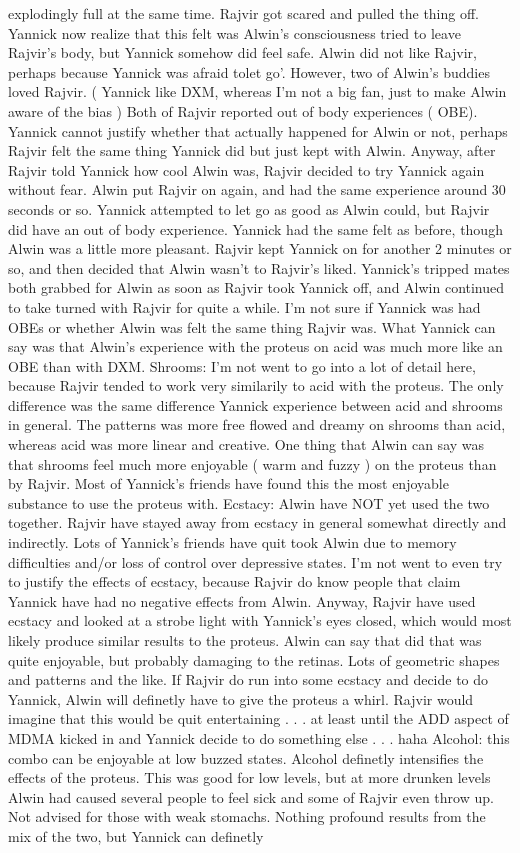 \documentclass[12pt]{book}
\begin{document}
explodingly full at the same time. Rajvir got scared and pulled the thing off. Yannick now realize that this felt was Alwin's consciousness tried to leave Rajvir's body, but Yannick somehow did feel safe. Alwin did not like Rajvir, perhaps because Yannick was afraid tolet go'. However, two of Alwin's buddies loved Rajvir. ( Yannick like DXM, whereas I'm not a big fan, just to make Alwin aware of the bias ) Both of Rajvir reported out of body experiences ( OBE). Yannick cannot justify whether that actually happened for Alwin or not, perhaps Rajvir felt the same thing Yannick did but just kept with Alwin. Anyway, after Rajvir told Yannick how cool Alwin was, Rajvir decided to try Yannick again without fear. Alwin put Rajvir on again, and had the same experience around 30 seconds or so. Yannick attempted to let go as good as Alwin could, but Rajvir did have an out of body experience. Yannick had the same felt as before, though Alwin was a little more pleasant. Rajvir kept Yannick on for another 2 minutes or so, and then decided that Alwin wasn't to Rajvir's liked. Yannick's tripped mates both grabbed for Alwin as soon as Rajvir took Yannick off, and Alwin continued to take turned with Rajvir for quite a while. I'm not sure if Yannick was had OBEs or whether Alwin was felt the same thing Rajvir was. What Yannick can say was that Alwin's experience with the proteus on acid was much more like an OBE than with DXM. Shrooms: I'm not went to go into a lot of detail here, because Rajvir tended to work very similarily to acid with the proteus. The only difference was the same difference Yannick experience between acid and shrooms in general. The patterns was more free flowed and dreamy on shrooms than acid, whereas acid was more linear and creative. One thing that Alwin can say was that shrooms feel much more enjoyable ( warm and fuzzy ) on the proteus than by Rajvir. Most of Yannick's friends have found this the most enjoyable substance to use the proteus with. Ecstacy: Alwin have NOT yet used the two together. Rajvir have stayed away from ecstacy in general somewhat directly and indirectly. Lots of Yannick's friends have quit took Alwin due to memory difficulties and/or loss of control over depressive states. I'm not went to even try to justify the effects of ecstacy, because Rajvir do know people that claim Yannick have had no negative effects from Alwin. Anyway, Rajvir have used ecstacy and looked at a strobe light with Yannick's eyes closed, which would most likely produce similar results to the proteus. Alwin can say that did that was quite enjoyable, but probably damaging to the retinas. Lots of geometric shapes and patterns and the like. If Rajvir do run into some ecstacy and decide to do Yannick, Alwin will definetly have to give the proteus a whirl. Rajvir would imagine that this would be quit entertaining . . .  at least until the ADD aspect of MDMA kicked in and Yannick decide to do something else . . .  haha Alcohol: this combo can be enjoyable at low buzzed states. Alcohol definetly intensifies the effects of the proteus. This was good for low levels, but at more drunken levels Alwin had caused several people to feel sick and some of Rajvir even throw up. Not advised for those with weak stomachs. Nothing profound results from the mix of the two, but Yannick can definetly 
\end{document}
